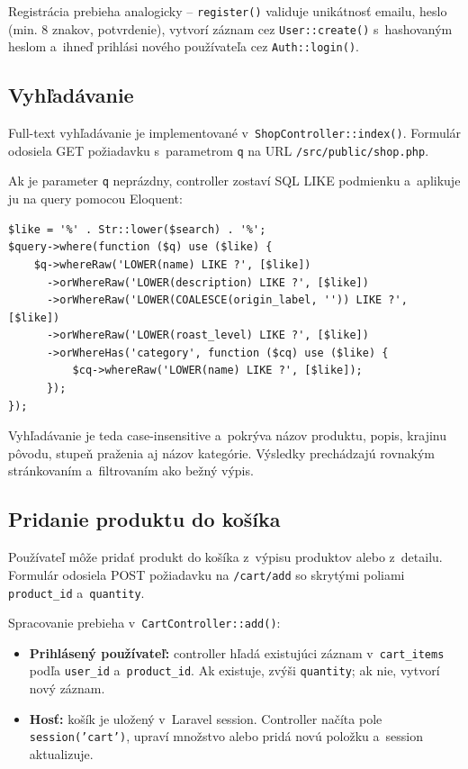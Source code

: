 \documentclass[12pt, a4paper]{article}
\begin{document}
Registrácia prebieha analogicky -- \texttt{register()} validuje unikátnosť emailu, heslo (min. 8 znakov, potvrdenie), vytvorí záznam cez \texttt{User::create()} s~hashovaným heslom a~ihneď prihlási nového používateľa cez \texttt{Auth::login()}.

\subsection{Vyhľadávanie}

Full-text vyhľadávanie je implementované v~\texttt{ShopController::index()}. Formulár odosiela GET požiadavku s~parametrom \texttt{q} na URL \texttt{/src/public/shop.php}.

Ak je parameter \texttt{q} neprázdny, controller zostaví SQL LIKE podmienku a~aplikuje ju na query pomocou Eloquent:

\begin{lstlisting}
$like = '%' . Str::lower($search) . '%';
$query->where(function ($q) use ($like) {
    $q->whereRaw('LOWER(name) LIKE ?', [$like])
      ->orWhereRaw('LOWER(description) LIKE ?', [$like])
      ->orWhereRaw('LOWER(COALESCE(origin_label, '')) LIKE ?', [$like])
      ->orWhereRaw('LOWER(roast_level) LIKE ?', [$like])
      ->orWhereHas('category', function ($cq) use ($like) {
          $cq->whereRaw('LOWER(name) LIKE ?', [$like]);
      });
});
\end{lstlisting}

Vyhľadávanie je teda case-insensitive a~pokrýva názov produktu, popis, krajinu pôvodu, stupeň praženia aj názov kategórie. Výsledky prechádzajú rovnakým stránkovaním a~filtrovaním ako bežný výpis.

\subsection{Pridanie produktu do košíka}

Používateľ môže pridať produkt do košíka z~výpisu produktov alebo z~detailu. Formulár odosiela POST požiadavku na \texttt{/cart/add} so skrytými poliami \texttt{product\_id} a~\texttt{quantity}.

Spracovanie prebieha v~\texttt{CartController::add()}:

\begin{itemize}
  \item \textbf{Prihlásený používateľ:} controller hľadá existujúci záznam v~\texttt{cart\_items} podľa \texttt{user\_id} a~\texttt{product\_id}. Ak existuje, zvýši \texttt{quantity}; ak nie, vytvorí nový záznam.
  \item \textbf{Hosť:} košík je uložený v~Laravel session. Controller načíta pole \texttt{session('cart')}, upraví množstvo alebo pridá novú položku a~session aktualizuje.
\end{itemize}
\end{document}
